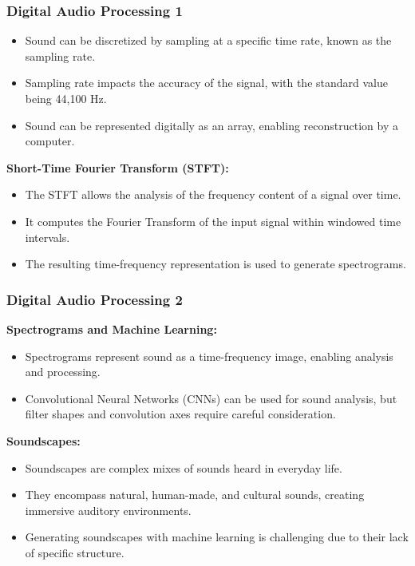 \begin{frame}
    \frametitle{Digital Audio Processing 1}

    \begin{itemize}
        \item Sound can be discretized by sampling at a specific time rate, known as the sampling rate.
        \item Sampling rate impacts the accuracy of the signal, with the standard value being 44,100 Hz.
        \item Sound can be represented digitally as an array, enabling reconstruction by a computer.
    \end{itemize}

    \textbf{Short-Time Fourier Transform (STFT):}
    \begin{itemize}
        \item The STFT allows the analysis of the frequency content of a signal over time.
        \item It computes the Fourier Transform of the input signal within windowed time intervals.
        \item The resulting time-frequency representation is used to generate spectrograms.
    \end{itemize}
\end{frame}

\begin{frame}
    \frametitle{Digital Audio Processing 2}

    \textbf{Spectrograms and Machine Learning:}
    \begin{itemize}
        \item Spectrograms represent sound as a time-frequency image, enabling analysis and processing.
        \item Convolutional Neural Networks (CNNs) can be used for sound analysis, but filter shapes and convolution axes require careful consideration.
    \end{itemize}

    \textbf{Soundscapes:}
    \begin{itemize}
        \item Soundscapes are complex mixes of sounds heard in everyday life.
        \item They encompass natural, human-made, and cultural sounds, creating immersive auditory environments.
        \item Generating soundscapes with machine learning is challenging due to their lack of specific structure.
    \end{itemize}
\end{frame}



